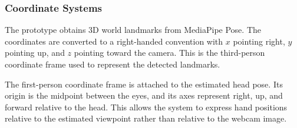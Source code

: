 \documentclass[12pt,a4paper]{article}
\begin{document}
\subsubsection{Coordinate Systems}

The prototype obtains 3D world landmarks from MediaPipe Pose. The coordinates are converted to a right-handed convention with $x$ pointing right, $y$ pointing up, and $z$ pointing toward the camera. This is the third-person coordinate frame used to represent the detected landmarks.

The first-person coordinate frame is attached to the estimated head pose. Its origin is the midpoint between the eyes, and its axes represent right, up, and forward relative to the head. This allows the system to express hand positions relative to the estimated viewpoint rather than relative to the webcam image.
\end{document}
